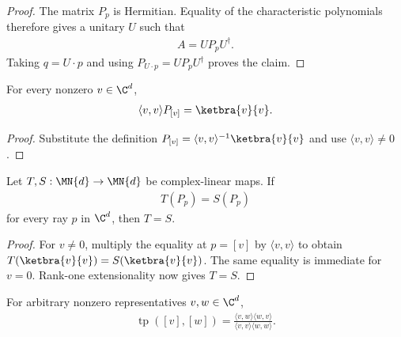\begin{proof}\leanok
    The matrix $P_p$ is Hermitian. Equality of the characteristic polynomials
    therefore gives a unitary $U$ such that
    \begin{align}
        A=UP_pU^\dagger.
    \end{align}
    Taking $q=U\cdot p$ and using $P_{U\cdot p}=UP_pU^\dagger$ proves the
    claim.
\end{proof}

\begin{theorem}
    \label{thm:star_dot_self_smul_normalized_pure_state_matrix}
    \leanok
    For every nonzero $v\in\C^d$,
    \begin{align}
        \langle v,v\rangle P_{[v]}=\ketbra{v}{v}.
    \end{align}
\end{theorem}

\begin{proof}\leanok
    Substitute the definition
    $P_{[v]}=\langle v,v\rangle^{-1}\ketbra{v}{v}$ and use
    $\langle v,v\rangle\ne0$.
\end{proof}

\begin{theorem}
    \label{thm:linear_map_eq_of_eq_on_pure_state_matrix}
    \leanok
    Let $T,S:\MN{d}\to\MN{d}$ be complex-linear maps. If
    \begin{align}
        T(P_p)=S(P_p)
    \end{align}
    for every ray $p$ in $\C^d$, then $T=S$.
\end{theorem}

\begin{proof}\leanok
    For $v\ne0$, multiply the equality at $p=[v]$ by
    $\langle v,v\rangle$ to obtain
    $T(\ketbra{v}{v})=S(\ketbra{v}{v})$. The same equality is immediate for
    $v=0$. Rank-one extensionality now gives $T=S$.
\end{proof}

\begin{theorem}
    \label{thm:projective_transition_probability_mk}
    \leanok
    For arbitrary nonzero representatives $v,w\in\C^d$,
    \begin{align}
        \operatorname{tp}([v],[w])
        =\frac{\langle v,w\rangle\langle w,v\rangle}
        {\langle v,v\rangle\langle w,w\rangle}.
    \end{align}
\end{theorem}

